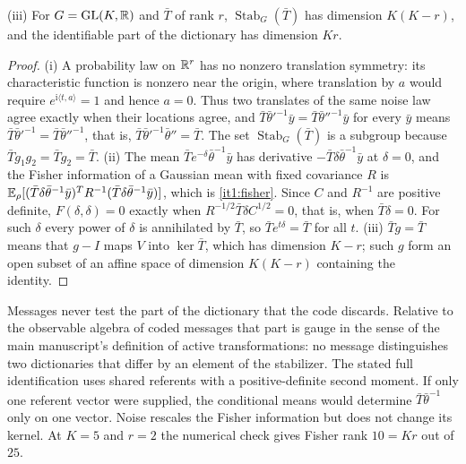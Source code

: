 \documentclass[11pt,letterpaper]{report}
\newcommand{\Stab}{\operatorname{Stab}}
\begin{document}
\textup{(iii)} For $G=\mathrm{GL}(K,\mathbb R)$ and $\bar T$ of rank $r$, $\Stab_G(\bar T)$ has dimension $K(K-r)$, and the identifiable part of the dictionary has dimension $Kr$.
\begin{proof}
(i) A probability law on $\mathbb R^r$ has no nonzero translation symmetry: its characteristic function is nonzero near the origin, where translation by $a$ would require $e^{\mathrm i\langle t,a\rangle}=1$ and hence $a=0$. Thus two translates of the same noise law agree exactly when their locations agree, and $\bar T\bar\theta'^{-1}\bar y=\bar T\bar\theta''^{-1}\bar y$ for every $\bar y$ means $\bar T\bar\theta'^{-1}=\bar T\bar\theta''^{-1}$, that is, $\bar T\bar\theta'^{-1}\bar\theta''=\bar T$. The set $\Stab_G(\bar T)$ is a subgroup because $\bar Tg_1g_2=\bar Tg_2=\bar T$. (ii) The mean $\bar T e^{-\delta}\bar\theta^{-1}\bar y$ has derivative $-\bar T\delta\bar\theta^{-1}\bar y$ at $\delta=0$, and the Fisher information of a Gaussian mean with fixed covariance $R$ is $\mathbb E_\rho[(\bar T\delta\bar\theta^{-1}\bar y)^TR^{-1}(\bar T\delta\bar\theta^{-1}\bar y)]$, which is \cref{it1:fisher}. Since $C$ and $R^{-1}$ are positive definite, $F(\delta,\delta)=0$ exactly when $R^{-1/2}\bar T\delta C^{1/2}=0$, that is, when $\bar T\delta=0$. For such $\delta$ every power of $\delta$ is annihilated by $\bar T$, so $\bar Te^{t\delta}=\bar T$ for all $t$. (iii) $\bar Tg=\bar T$ means that $g-I$ maps $V$ into $\ker\bar T$, which has dimension $K-r$; such $g$ form an open subset of an affine space of dimension $K(K-r)$ containing the identity.
\end{proof}

Messages never test the part of the dictionary that the code discards. Relative to the observable algebra of coded messages that part is gauge in the sense of the main manuscript's definition of active transformations: no message distinguishes two dictionaries that differ by an element of the stabilizer. The stated full identification uses shared referents with a positive-definite second moment. If only one referent vector were supplied, the conditional means would determine $\bar T\bar\theta^{-1}$ only on one vector. Noise rescales the Fisher information but does not change its kernel. At $K=5$ and $r=2$ the numerical check gives Fisher rank $10=Kr$ out of $25$.
\end{document}
